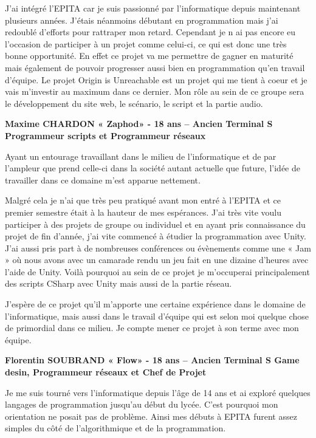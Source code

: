 \documentclass[12pt,a4paper]{article}
\begin{document}
J'ai intégré l'EPITA car je suis passionné par l'informatique depuis maintenant plusieurs années. J'étais néanmoins débutant en programmation mais j'ai redoublé d'efforts pour rattraper mon retard. Cependant je n ai pas encore eu l'occasion de participer à un projet comme celui-ci, ce qui est donc une très bonne opportunité. En effet ce projet va me permettre de gagner en maturité mais également de pouvoir progresser aussi bien en programmation qu'en travail d'équipe. Le projet Origin is Unreachable est un projet qui me tient à coeur et je vais m'investir au maximum dans ce dernier. Mon rôle au sein de ce groupe sera le développement du site web, le scénario, le script et la partie audio. 
\newpage
\begin{center}
\textbf{Maxime CHARDON « Zaphod» - 18 ans – Ancien Terminal S
Programmeur scripts et Programmeur réseaux}
\end{center}

Ayant un entourage travaillant dans le milieu de l’informatique et de par l’ampleur que prend celle-ci dans la société autant actuelle que future, l’idée de travailler dans ce domaine m'est apparue nettement.

Malgré cela je n’ai que très peu pratiqué avant mon entré à l’EPITA et ce premier semestre était à la hauteur de mes espérances. J’ai très vite voulu participer à des projets de groupe ou individuel et en ayant pris connaissance du projet de fin d’année, j’ai vite commencé à étudier la programmation avec Unity. J’ai aussi pris part à de nombreuses conférences ou évènements comme une « Jam » où nous avons avec un camarade rendu un jeu fait en une dizaine d’heures avec l’aide de Unity. Voilà pourquoi au sein de ce projet je m’occuperai principalement des scripts CSharp avec Unity mais aussi de la partie réseau.

J’espère de ce projet qu’il m’apporte une certaine expérience dans le domaine de l’informatique, mais aussi dans le travail d’équipe qui est selon moi quelque chose de primordial dans ce milieu. Je compte mener ce projet à son terme avec mon équipe.

\begin{center}
\textbf{Florentin SOUBRAND « Flow» - 18 ans – Ancien Terminal S \newline
Game desin, Programmeur réseaux et Chef de Projet}
\end{center}
	Je me suis tourné vers l'informatique depuis l'âge de 14 ans et ai exploré quelques langages de programmation jusqu'au début du lycée. C'est pourquoi mon orientation ne posait pas de problème. Ainsi mes débuts à EPITA furent assez simples du côté de l'algorithmique et de la programmation.
\end{document}
